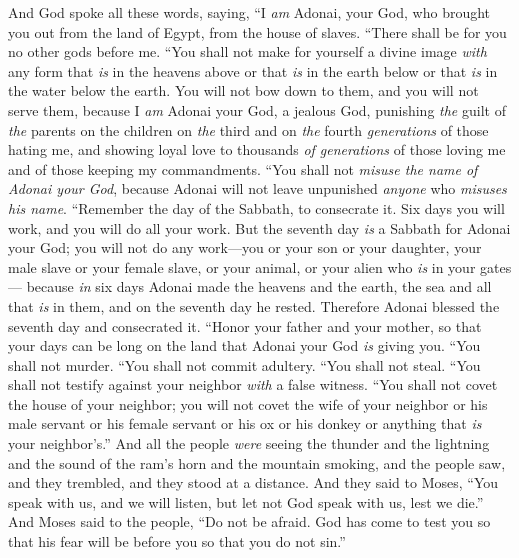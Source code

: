 \begin{biblechapter} %
 And God spoke all these words, saying,
\verse “I \textit{am} Adonai, your God, who brought you out from the land of Egypt, from the house of slaves.
\verse “There shall be for you no other gods before me.
\verse “You shall not make for yourself a divine image \textit{with} any form that \textit{is} in the heavens above or that \textit{is} in the earth below or that \textit{is} in the water below the earth.
\verse You will not bow down to them, and you will not serve them, because I \textit{am} Adonai your God, a jealous God, punishing \textit{the} guilt of \textit{the} parents on the children on \textit{the} third and on \textit{the} fourth \textit{generations} of those hating me,
\verse and showing loyal love to thousands \textit{of generations} of those loving me and of those keeping my commandments.
\verse “You shall not \textit{misuse the name of Adonai your God}, because Adonai will not leave unpunished \textit{anyone} who \textit{misuses his name}.
\verse “Remember the day of the Sabbath, to consecrate it.
\verse Six days you will work, and you will do all your work.
\verse But the seventh day \textit{is} a Sabbath for Adonai your God; you will not do any work—you or your son or your daughter, your male slave or your female slave, or your animal, or your alien who \textit{is} in your gates—
\verse because \textit{in} six days Adonai made the heavens and the earth, the sea and all that \textit{is} in them, and on the seventh day he rested. Therefore Adonai blessed the seventh day and consecrated it.
\verse “Honor your father and your mother, so that your days can be long on the land that Adonai your God \textit{is} giving you.
\verse “You shall not murder.
\verse “You shall not commit adultery.
\verse “You shall not steal.
\verse “You shall not testify against your neighbor \textit{with} a false witness.
\verse “You shall not covet the house of your neighbor; you will not covet the wife of your neighbor or his male servant or his female servant or his ox or his donkey or anything that \textit{is} your neighbor’s.”
\verse And all the people \textit{were} seeing the thunder and the lightning and the sound of the ram’s horn and the mountain smoking, and the people saw, and they trembled, and they stood at a distance.
\verse And they said to Moses, “You speak with us, and we will listen, but let not God speak with us, lest we die.”
\verse And Moses said to the people, “Do not be afraid. God has come to test you so that his fear will be before you so that you do not sin.”

\end{biblechapter}

